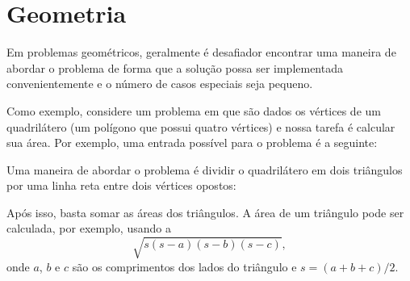 \chapter{Geometria}


Em problemas geométricos, geralmente é desafiador encontrar uma maneira de abordar o problema de forma que a solução possa ser implementada convenientemente e o número de casos especiais seja pequeno.

Como exemplo, considere um problema em que são dados os vértices de um quadrilátero (um polígono que possui quatro vértices) e nossa tarefa é calcular sua área. Por exemplo, uma entrada possível para o problema é a seguinte:

\begin{center}
\end{center}
Uma maneira de abordar o problema é dividir o quadrilátero em dois triângulos por uma linha reta entre dois vértices opostos:
\begin{center}
\end{center}
Após isso, basta somar as áreas dos triângulos. A área de um triângulo pode ser calculada, por exemplo, usando a 
\[ \sqrt{s (s-a) (s-b) (s-c)},\]
onde $a$, $b$ e $c$ são os comprimentos dos lados do triângulo e
$s=(a+b+c)/2$.

